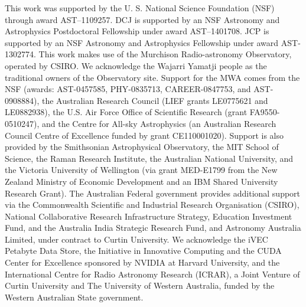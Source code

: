 \documentclass[preprint2,apjl,numberedappendix,twocolappendix,appendixfloats]{emulateapj}
\begin{document}
\acknowledgments

This work was supported by the U. S. National Science Foundation (NSF) through award AST--1109257. DCJ is supported by an NSF Astronomy and Astrophysics Postdoctoral Fellowship under award AST--1401708. JCP is supported by an NSF Astronomy and Astrophysics Fellowship under award AST-1302774. This work makes use of the Murchison Radio-astronomy Observatory, operated by CSIRO. We acknowledge the Wajarri Yamatji people as the traditional owners of the Observatory site. Support for the MWA comes from the NSF (awards: AST-0457585, PHY-0835713, CAREER-0847753, and AST-0908884), the Australian Research Council (LIEF grants LE0775621 and LE0882938), the U.S. Air Force Office of Scientific Research (grant FA9550-0510247), and the Centre for All-sky Astrophysics (an Australian Research Council Centre of Excellence funded by grant CE110001020). Support is also provided by the Smithsonian Astrophysical Observatory, the MIT School of Science, the Raman Research Institute, the Australian National University, and the Victoria University of Wellington (via grant MED-E1799 from the New Zealand Ministry of Economic Development and an IBM Shared University Research Grant). The Australian Federal government provides additional support via the Commonwealth Scientific and Industrial Research Organisation (CSIRO), National Collaborative Research Infrastructure Strategy, Education Investment Fund, and the Australia India Strategic Research Fund, and Astronomy Australia Limited, under contract to Curtin University. We acknowledge the iVEC Petabyte Data Store, the Initiative in Innovative Computing and the CUDA Center for Excellence sponsored by NVIDIA at Harvard University, and the International Centre for Radio Astronomy Research (ICRAR), a Joint Venture of Curtin University and The University of Western Australia, funded by the Western Australian State government.  



\end{document}
